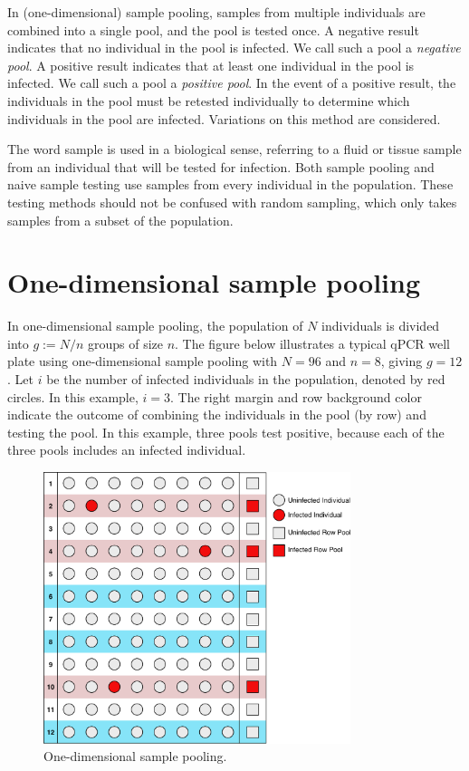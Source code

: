 \documentclass[letterpaper]{article}
\begin{document}
In (one-dimensional) sample pooling, samples from multiple individuals
are combined into a single pool, and the pool is tested once. A negative
result indicates that no individual in the pool is infected. We call
such a pool a \emph{negative pool}. A positive result indicates that at
least one individual in the pool is infected. We call such a pool a
\emph{positive pool}. In the event of a positive result, the individuals
in the pool must be retested individually to determine which individuals
in the pool are infected. Variations on this method are considered.

The word sample is used in a biological sense, referring to a fluid or
tissue sample from an individual that will be tested for infection. Both
sample pooling and naive sample testing use samples from every
individual in the population. These testing methods should not be
confused with random sampling, which only takes samples from a subset of
the population.

\hypertarget{one-dimensional-sample-pooling}{%
\section{One-dimensional sample pooling}
\label{one-dimensional-sample-pooling}}

In one-dimensional sample pooling, the population of $N$ individuals
is divided into $g:=N/n$ groups of size $n$. The figure below
illustrates a typical qPCR well plate using one-dimensional sample
pooling with $N=96$ and $n=8$, giving $g=12$. Let $i$ be the
number of infected individuals in the population, denoted by red
circles. In this example, $i=3$. The right margin and row background
color indicate the outcome of combining the individuals in the pool (by
row) and testing the pool. In this example, three pools test positive,
because each of the three pools includes an infected individual.


\begin{figure}
	\centering
	\includegraphics[width=0.8\textwidth]{Fig1DimPooling.pdf}
	\caption{One-dimensional sample pooling.}
\end{figure}
\end{document}
